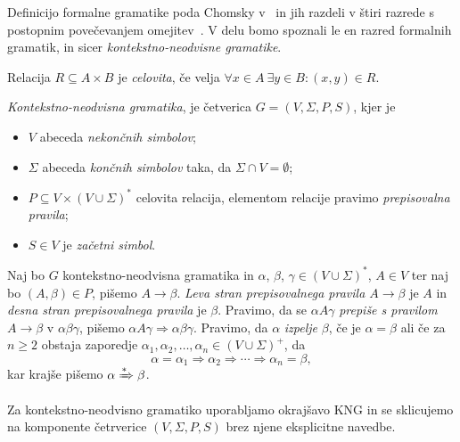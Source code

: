 \documentclass[fin1, tisk]{fmfdelo}
\theoremstyle{definition}
\begin{document}
Definicijo formalne gramatike poda Chomsky v~\cite{Chomsky1956} in jih razdeli v štiri razrede s 
postopnim povečevanjem omejitev~\cite{Chomsky1959, ChomskySchutzenberger1963}.
V delu bomo spoznali le en razred formalnih gramatik, in sicer \emph{kontekstno-neodvisne gramatike}.

\begin{definicija}
    Relacija $R \subseteq A \times B$ je \emph{celovita}, če velja 
    $\forall x \in A \ \exists y \in B \colon (x,y) \in R$.
\end{definicija}

\begin{definicija}
    \emph{Kontekstno-neodvisna gramatika}, je četverica $G = (V, \Sigma, P, S)$,
    kjer je
    \begin{itemize}
        \item $V$ abeceda \emph{nekončnih simbolov};
        \item $\Sigma$ abeceda \emph{končnih simbolov} taka, da $\Sigma \cap V = \emptyset$;
        \item $P \subseteq V \times ( V \cup \Sigma )^*$ celovita relacija, elementom 
        relacije pravimo \emph{prepisovalna pravila};
        \item $S \in V$ je \emph{začetni simbol}.
    \end{itemize}
\end{definicija}

\begin{definicija}
    Naj bo $G$ kontekstno-neodvisna gramatika in $\alpha$, $\beta$, $\gamma \in (V \cup \Sigma)^*$,
    $A \in V$ ter naj bo $(A, \beta) \in P$, pišemo $A \rightarrow \beta$. 
    \emph{Leva stran prepisovalnega pravila $A \rightarrow \beta$} je $A$ in 
    \emph{desna stran prepisovalnega pravila} je $\beta$. Pravimo, da se 
    $\alpha A \gamma$ \emph{prepiše s pravilom} $A \rightarrow \beta$ v $\alpha\beta\gamma$,
    pišemo $\alpha A \gamma \Rightarrow \alpha\beta\gamma$. Pravimo, da $\alpha $ \emph{izpelje} 
    $\beta$, če je $\alpha = \beta$ ali če za $n \geq 2$ obstaja zaporedje 
    $\alpha_1, \alpha_2, \ldots, \alpha_n \in (V \cup \Sigma)^+$, da 
    \[
        \alpha = \alpha_1 \Rightarrow \alpha_2 \Rightarrow \cdots \Rightarrow \alpha_n
        = \beta,
    \]
    kar krajše pišemo $\alpha \xRightarrow{*} \beta$.
\end{definicija}

Za kontekstno-neodvisno gramatiko uporabljamo okrajšavo KNG in se sklicujemo na komponente
četrverice $(V, \Sigma, P, S)$ brez njene eksplicitne navedbe.
\end{document}
